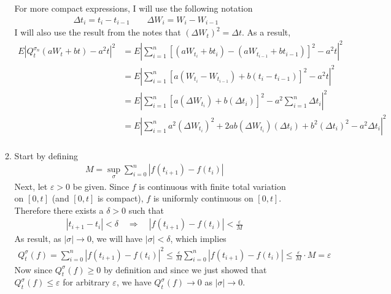 \documentclass[12pt]{article}
\theoremstyle{plain}
\theoremstyle{definition}
\theoremstyle{remark}
\begin{document}
\begin{enumerate}
\begin{enumerate}
        For more compact expressions, I will use the following notation
        \begin{align*}
          \Delta t_i = t_i-t_{i-1} \qquad
          \Delta W_i = W_i-W_{i-1} \qquad
        \end{align*}
        I will also use the result from the notes that $(\Delta W_t)^2=
        \Delta t$. As a result,
        \begin{align*}
          E|Q^{\sigma_n}_t(aW_t + bt) - a^2 t |^2
          &=
          E\left\lvert
            \sum^{n}_{i=1}
              \left[
                \left(aW_{t_{i}} + bt_{i}\right)
                -\left(aW_{t_{i-1}} + bt_{i-1}\right)
              \right]^2
              - a^2 t
          \right\rvert^2\\
          &=
          E\left\lvert
            \sum^{n}_{i=1}
              \left[
                a\left(W_{t_{i}} - W_{t_{i-1}}\right)
                + b\left(t_{i} - t_{i-1}\right)
              \right]^2
              - a^2 t
          \right\rvert^2\\
          &=
          E\left\lvert
            \sum^{n}_{i=1}
              \left[
                a\left(\Delta W_{t_{i}}\right)
                + b\left(\Delta t_i \right)
              \right]^2
              - a^2 \sum^n_{i=1} \Delta t_i
          \right\rvert^2\\
          &=
          E\left\lvert
            \sum^{n}_{i=1}
                a^2\left(\Delta W_{t_{i}}\right)^2
                + 2ab\left(\Delta W_{t_{i}}\right)\left(\Delta t_i \right)
                + b^2\left(\Delta t_i \right)^2
              - a^2 \Delta t_i
          \right\rvert^2\\
        \end{align*}
      \item %
        Start by defining
        \begin{align*}
          M = \sup_{\sigma} \sum^n_{i=0} |f(t_{i+1})-f(t_i)|
        \end{align*}
        Next, let $\varepsilon>0$ be given. Since $f$ is continuous with
        finite total variation on $[0,t]$ (and $[0,t]$ is compact), $f$
        is uniformly continuous on $[0,t]$. Therefore there exists a
        $\delta>0$ such that
        \begin{align*}
          |t_{i+1}-t_i|<\delta
          \quad \Rightarrow \quad
          |f(t_{i+1}) - f(t_i)|< \frac{\varepsilon}{M}
        \end{align*}
        As result, as $|\sigma|\rightarrow0$, we will have
        $|\sigma|<\delta$, which implies
        \begin{align*}
          Q^\sigma_t(f) = \sum^n_{i=0} |f(t_{i+1})-f(t_i)|^2
          \leq
          \frac{\varepsilon}{M}
          \sum^n_{i=0} |f(t_{i+1})-f(t_i)|
          \leq \frac{\varepsilon}{M} \cdot M
          = \varepsilon
        \end{align*}
        Now since $Q^\sigma_t(f)\geq 0$ by definition and since we just
        showed that $Q^\sigma_t(f)\leq\varepsilon$ for arbitrary
        $\varepsilon$, we have $Q^\sigma_t(f)\rightarrow 0$ as
        $|\sigma|\rightarrow0$.



\end{enumerate}
\end{enumerate}
\end{document}
